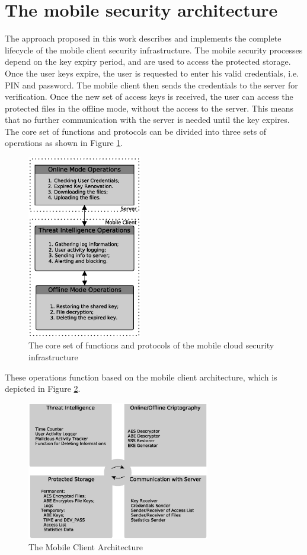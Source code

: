 \documentclass[twocolumn]{svjour3}          	%
\begin{document}
\section{The mobile security architecture}
\label{sec_the_client_security_architecture}
The approach proposed in this work describes and implements the complete lifecycle of the mobile client security infrastructure. The mobile security processes depend on the key expiry period, and are used to access the protected storage. Once the user keys expire, the user is requested to enter his valid credentials, i.e. PIN and password. The mobile client then sends the credentials to the server for verification. Once the new set of access keys is received, the user can access the protected files in the offline mode, without the access to the server. This means that no further communication with the server is needed until the key expires. The core set of functions and protocols can be divided into three sets of operations as shown in Figure \ref{fig:01}.

\begin{figure}[h!]
	\centering
	\includegraphics[width=5cm]{fig01.eps}
	\caption{The core set of functions and protocols of the mobile cloud security infrastructure}
	\label{fig:01}
\end{figure}

These operations function based on the mobile client architecture, which is depicted in Figure \ref{fig:02}. 

\begin{figure}[h!]
	\centering
	\includegraphics[width=8cm]{fig02.eps}
	\caption{The Mobile Client Architecture}
	\label{fig:02}
\end{figure}
\end{document}
